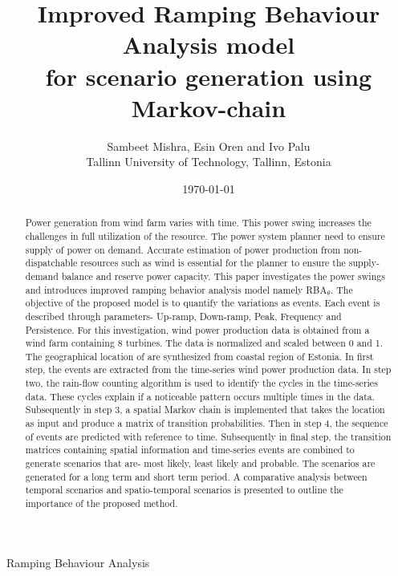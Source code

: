 \documentclass[11pt]{article}
\begin{document}
\title{Improved Ramping Behaviour Analysis model \\ for scenario generation using Markov-chain}
\author{
        Sambeet Mishra, Esin Oren and Ivo Palu\\
    Tallinn University of Technology, Tallinn, Estonia
}
\date{\today}
\maketitle

\begin{abstract}
Power generation from wind farm varies with time. This power swing increases the challenges in full utilization of the resource. The power system planner need to ensure supply of power on demand. Accurate estimation of power production from non-dispatchable resources such as wind is essential for the planner to ensure the supply-demand balance and reserve power capacity. 
This paper investigates the power swings and introduces improved ramping behavior analysis model namely RBA$_\theta$. The objective of the proposed model is to quantify the variations as events. Each event is described through parameters- Up-ramp, Down-ramp, Peak, Frequency and Persistence. For this investigation, wind power production data is obtained from a wind farm containing 8 turbines. The data is normalized and scaled between 0 and 1. The geographical location of are synthesized from coastal region of Estonia. In first step, the events are extracted from the time-series wind power production data. In step two, the rain-flow counting algorithm is used to identify the cycles in the time-series data. These cycles explain if a noticeable pattern occurs multiple times in the data.  
Subsequently in step 3, a spatial Markov chain is implemented that takes the location as input and produce a matrix of transition probabilities. Then in step 4, the sequence of events are predicted with reference to time. Subsequently in final step, the transition matrices containing spatial information and time-series events are combined to generate scenarios that are- most likely, least likely and probable. The scenarios are generated for a long term and short term period. A comparative analysis between temporal scenarios and spatio-temporal scenarios is presented to outline the importance of the proposed method. 
\end{abstract}



\begin{description}[noitemsep]
\item[Nomenclature] 
\item[RBA]	Ramping Behaviour Analysis
\end{description}
\end{document}
